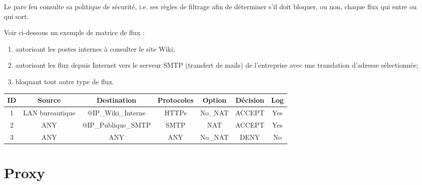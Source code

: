 Le pare feu consulte sa politique de sécurité, i.e. ses règles de filtrage afin de déterminer s'il doit bloquer, ou non, chaque flux qui entre ou qui sort.

Voir ci-dessous un exemple de matrice de flux : 
\begin{enumerate}
    \item autorisant les postes internes à consulter le site Wiki;
    \item autorisant les flux depuis Internet vers le serveur SMTP (transfert de mails) de l'entreprise avec une translation d'adresse sélectionnée;
    \item bloquant tout autre type de flux.
\end{enumerate}

\begin{center}
\begin{tabular}{||c c c c c c c ||} 
 \hline
 ID & Source & Destination & Protocoles & Option & Décision & Log \\ [0.5ex] 
 \hline\hline
 1 & LAN bureautique & @IP_Wiki_Interne & HTTPs & No_NAT & ACCEPT & Yes \\ 
 \hline
 2 & ANY & @IP_Publique_SMTP & SMTP & NAT & ACCEPT & Yes \\
 \hline
 3 & ANY & ANY & ANY & No_NAT & DENY & No \\
 \hline
\end{tabular}
\end{center}


\section{Proxy}


